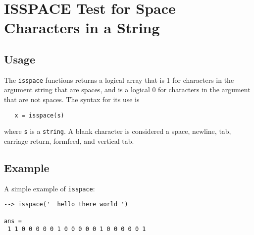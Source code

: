 \section{ISSPACE Test for Space Characters in a String}

\subsection{Usage}

The \verb|isspace| functions returns a logical array that is 1 
for characters in the argument string that are spaces, and 
is a logical 0 for characters in the argument that are not
spaces.  The syntax for its use is
\begin{verbatim}
   x = isspace(s)
\end{verbatim}
where \verb|s| is a \verb|string|.  A blank character is considered
a space, newline, tab, carriage return, formfeed, and vertical
tab.
\subsection{Example}

A simple example of \verb|isspace|:
\begin{verbatim}
--> isspace('  hello there world ')

ans = 
 1 1 0 0 0 0 0 1 0 0 0 0 0 1 0 0 0 0 0 1 
\end{verbatim}
